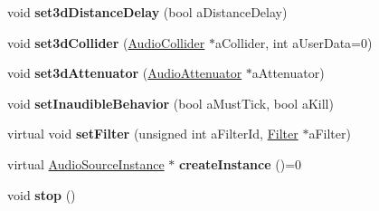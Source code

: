 \begin{DoxyCompactItemize}
void {\bfseries set3d\+Distance\+Delay} (bool a\+Distance\+Delay)
\item 
\mbox{\label{class_so_loud_1_1_audio_source_a4613f7463b4b8addb2a9e0622b9d4add}} 
void {\bfseries set3d\+Collider} (\mbox{\hyperlink{class_so_loud_1_1_audio_collider}{Audio\+Collider}} $\ast$a\+Collider, int a\+User\+Data=0)
\item 
\mbox{\label{class_so_loud_1_1_audio_source_a39a7ea2b96454986488ce09d4f7f3ff0}} 
void {\bfseries set3d\+Attenuator} (\mbox{\hyperlink{class_so_loud_1_1_audio_attenuator}{Audio\+Attenuator}} $\ast$a\+Attenuator)
\item 
\mbox{\label{class_so_loud_1_1_audio_source_a692f6985ec2451e6f005e95370e8fd66}} 
void {\bfseries set\+Inaudible\+Behavior} (bool a\+Must\+Tick, bool a\+Kill)
\item 
\mbox{\label{class_so_loud_1_1_audio_source_afcb0e33e12b051b2746377b0610398a9}} 
virtual void {\bfseries set\+Filter} (unsigned int a\+Filter\+Id, \mbox{\hyperlink{class_so_loud_1_1_filter}{Filter}} $\ast$a\+Filter)
\item 
\mbox{\label{class_so_loud_1_1_audio_source_a998f467f3429af13fd0bcbe9f842ddbe}} 
virtual \mbox{\hyperlink{class_so_loud_1_1_audio_source_instance}{Audio\+Source\+Instance}} $\ast$ {\bfseries create\+Instance} ()=0
\item 
\mbox{\label{class_so_loud_1_1_audio_source_adf861c6b20ed4c2bd318befcd00b3e8b}} 
void {\bfseries stop} ()
\end{DoxyCompactItemize}
